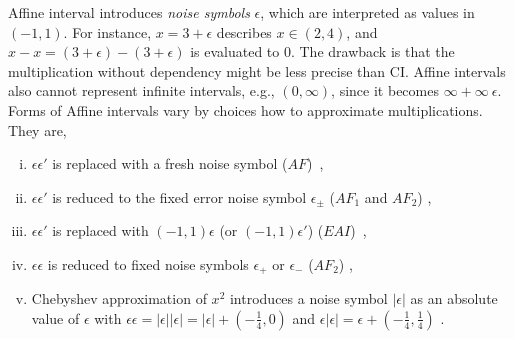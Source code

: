 \documentclass[runningheads,a4paper,oribibl]{llncs}
\newcommand{\suppress}[1]{} %
\begin{document}
Affine interval introduces \emph{noise symbols} $\epsilon$, 
which are interpreted as values in $(-1,1)$. 
For instance, $x = 3 + \epsilon$ describes $x \in (2,4)$, and 
$x - x = (3 + \epsilon) - (3 + \epsilon)$ is evaluated to $0$. 
The drawback is that the multiplication without dependency might be less precise than CI.
Affine intervals also cannot represent infinite intervals, e.g., $(0,\infty)$, 
since it becomes $\infty + \infty~\epsilon$. 
Forms of Affine intervals vary by choices how to approximate multiplications. They are,
\begin{enumerate}[(i)]
\item $\epsilon \epsilon'$ is replaced with a fresh noise symbol 
($AF$)~\cite{Comba93affinearithmetic}, 
\item $\epsilon \epsilon'$ is reduced to the fixed error noise symbol 
$\epsilon_{\pm}$ ($AF_1$ and $AF_2$) \cite{Messine_extensionsof},
\item $\epsilon \epsilon'$ is replaced with $(-1,1) \epsilon$ 
(or $(-1,1) \epsilon'$) ($EAI$)~\cite{Ngoc:2009:ORE:1685167.1685421},
\item $\epsilon \epsilon$ is reduced to fixed noise symbols 
$\epsilon_+$ or $\epsilon_{-}$ ($AF_2$) \cite{Messine_extensionsof}, 
\item Chebyshev approximation of $x^2$ introduces a noise symbol $|\epsilon|$ 
as an absolute value of $\epsilon$ with 
$\epsilon \epsilon = |\epsilon| |\epsilon| = |\epsilon| + (-\frac{1}{4}, 0)$ and
$\epsilon |\epsilon| = \epsilon + (-\frac{1}{4}, \frac{1}{4})$ \cite{VanKhanh201227}. 
\end{enumerate} 

\suppress{
\begin{remark}
For Affine intervals, \emph{sensitivity}~\cite{ngocsefm} of a variable
is a possible range of the absolute value of the coefficient of its corresponding $\epsilon$. 


Note that Affine interval works only for bounded intervals. 
For instance, $\infty + \infty \epsilon$ represents $(-\infty,\infty)$, which says nothing. 
Narrowing intervals as an incremental search (Section~\ref{sec:incsearch})
partially depends on this fact. 
That is, if $\pm \infty$ is contained in an interval, first give finite upper/lower bounds and
search within these bounds using an Affine interval.
If UNSAT is concluded, then enlarge to the whole intervals using CI. 
\end{remark}
}
\end{document}
